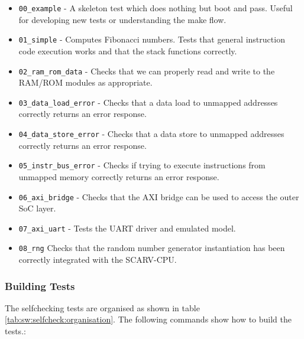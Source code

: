 \begin{itemize}
\item {\tt 00\_example} - A skeleton test which does nothing but boot
    and pass. 
    Useful for developing new tests or understanding the make flow.

\item {\tt 01\_simple} -
    Computes Fibonacci numbers. Tests that general instruction
    code execution works and that the stack functions correctly.

\item {\tt 02\_ram\_rom\_data} -
    Checks that we can properly read and write to the RAM/ROM
    modules as appropriate.

\item {\tt 03\_data\_load\_error} -
    Checks that a data load to unmapped addresses correctly returns an
    error response.

\item {\tt 04\_data\_store\_error} -
    Checks that a data store to unmapped addresses correctly returns an
    error response.

\item {\tt 05\_instr\_bus\_error} - 
    Checks if trying to execute instructions from unmapped memory
    correctly returns an error response.

\item {\tt 06\_axi\_bridge} -
    Checks that the AXI bridge can be used to access the outer
    SoC layer.

\item {\tt 07\_axi\_uart} - 
    Tests the UART driver and emulated model.

\item {\tt 08\_rng}
    Checks that the random number generator instantiation has been
    correctly integrated with the SCARV-CPU.

\end{itemize}

\subsubsection{Building Tests}

The selfchecking tests are organised as shown in table
\ref{tab:sw:selfcheck:organisation}.
The following commands show how to build the tests.:

